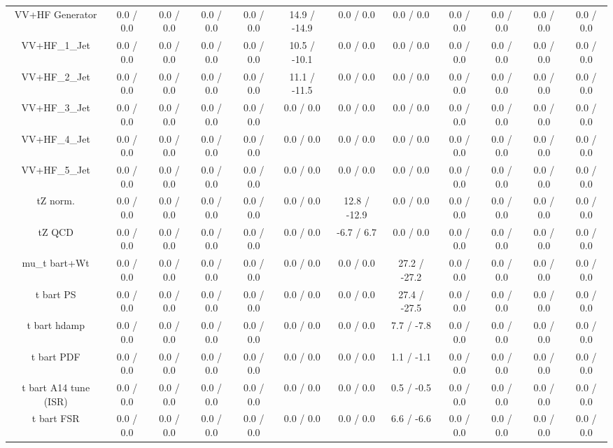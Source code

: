 \begin{table}[htbp]
\begin{center}
\begin{tabular}{|c|c|c|c|c|c|c|c|c|c|c|c|}
  VV+HF Generator & 0.0 / 0.0 & 0.0 / 0.0 & 0.0 / 0.0 & 0.0 / 0.0 & 14.9 / -14.9 & 0.0 / 0.0 & 0.0 / 0.0 & 0.0 / 0.0 & 0.0 / 0.0 & 0.0 / 0.0 & 0.0 / 0.0 \\ 
  VV+HF_1_Jet & 0.0 / 0.0 & 0.0 / 0.0 & 0.0 / 0.0 & 0.0 / 0.0 & 10.5 / -10.1 & 0.0 / 0.0 & 0.0 / 0.0 & 0.0 / 0.0 & 0.0 / 0.0 & 0.0 / 0.0 & 0.0 / 0.0 \\ 
  VV+HF_2_Jet & 0.0 / 0.0 & 0.0 / 0.0 & 0.0 / 0.0 & 0.0 / 0.0 & 11.1 / -11.5 & 0.0 / 0.0 & 0.0 / 0.0 & 0.0 / 0.0 & 0.0 / 0.0 & 0.0 / 0.0 & 0.0 / 0.0 \\ 
  VV+HF_3_Jet & 0.0 / 0.0 & 0.0 / 0.0 & 0.0 / 0.0 & 0.0 / 0.0 & 0.0 / 0.0 & 0.0 / 0.0 & 0.0 / 0.0 & 0.0 / 0.0 & 0.0 / 0.0 & 0.0 / 0.0 & 0.0 / 0.0 \\ 
  VV+HF_4_Jet & 0.0 / 0.0 & 0.0 / 0.0 & 0.0 / 0.0 & 0.0 / 0.0 & 0.0 / 0.0 & 0.0 / 0.0 & 0.0 / 0.0 & 0.0 / 0.0 & 0.0 / 0.0 & 0.0 / 0.0 & 0.0 / 0.0 \\ 
  VV+HF_5_Jet & 0.0 / 0.0 & 0.0 / 0.0 & 0.0 / 0.0 & 0.0 / 0.0 & 0.0 / 0.0 & 0.0 / 0.0 & 0.0 / 0.0 & 0.0 / 0.0 & 0.0 / 0.0 & 0.0 / 0.0 & 0.0 / 0.0 \\ 
  tZ norm. & 0.0 / 0.0 & 0.0 / 0.0 & 0.0 / 0.0 & 0.0 / 0.0 & 0.0 / 0.0 & 12.8 / -12.9 & 0.0 / 0.0 & 0.0 / 0.0 & 0.0 / 0.0 & 0.0 / 0.0 & 0.0 / 0.0 \\ 
  tZ QCD & 0.0 / 0.0 & 0.0 / 0.0 & 0.0 / 0.0 & 0.0 / 0.0 & 0.0 / 0.0 & -6.7 / 6.7 & 0.0 / 0.0 & 0.0 / 0.0 & 0.0 / 0.0 & 0.0 / 0.0 & 0.0 / 0.0 \\ 
   mu_{t bar{t}+Wt} & 0.0 / 0.0 & 0.0 / 0.0 & 0.0 / 0.0 & 0.0 / 0.0 & 0.0 / 0.0 & 0.0 / 0.0 & 27.2 / -27.2 & 0.0 / 0.0 & 0.0 / 0.0 & 0.0 / 0.0 & 0.0 / 0.0 \\ 
  t bar{t} PS & 0.0 / 0.0 & 0.0 / 0.0 & 0.0 / 0.0 & 0.0 / 0.0 & 0.0 / 0.0 & 0.0 / 0.0 & 27.4 / -27.5 & 0.0 / 0.0 & 0.0 / 0.0 & 0.0 / 0.0 & 0.0 / 0.0 \\ 
  t bar{t} hdamp & 0.0 / 0.0 & 0.0 / 0.0 & 0.0 / 0.0 & 0.0 / 0.0 & 0.0 / 0.0 & 0.0 / 0.0 & 7.7 / -7.8 & 0.0 / 0.0 & 0.0 / 0.0 & 0.0 / 0.0 & 0.0 / 0.0 \\ 
  t bar{t} PDF & 0.0 / 0.0 & 0.0 / 0.0 & 0.0 / 0.0 & 0.0 / 0.0 & 0.0 / 0.0 & 0.0 / 0.0 & 1.1 / -1.1 & 0.0 / 0.0 & 0.0 / 0.0 & 0.0 / 0.0 & 0.0 / 0.0 \\ 
  t bar{t} A14 tune (ISR) & 0.0 / 0.0 & 0.0 / 0.0 & 0.0 / 0.0 & 0.0 / 0.0 & 0.0 / 0.0 & 0.0 / 0.0 & 0.5 / -0.5 & 0.0 / 0.0 & 0.0 / 0.0 & 0.0 / 0.0 & 0.0 / 0.0 \\ 
  t bar{t} FSR & 0.0 / 0.0 & 0.0 / 0.0 & 0.0 / 0.0 & 0.0 / 0.0 & 0.0 / 0.0 & 0.0 / 0.0 & 6.6 / -6.6 & 0.0 / 0.0 & 0.0 / 0.0 & 0.0 / 0.0 & 0.0 / 0.0 \\ 

\end{tabular}
\end{center}
\end{table}
